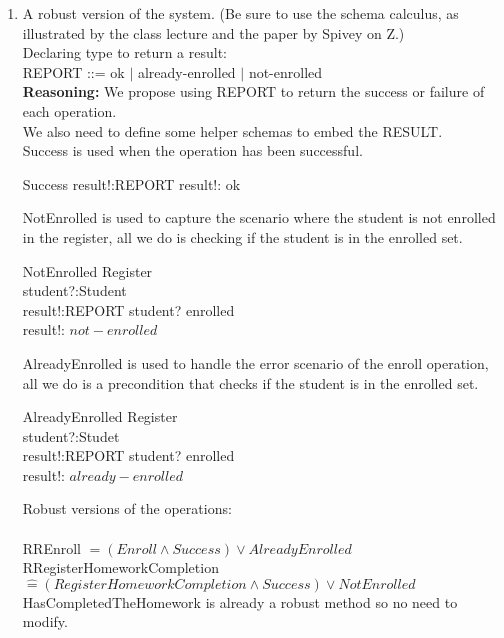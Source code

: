 \documentclass{article}
\newcommand{\estimates}{\mathrel{\hat{=}}}
\begin{document}
\begin{enumerate}
\item A robust version of the system. (Be sure to use the schema calculus, as illustrated by the class lecture and the paper by Spivey on Z.) \\
  Declaring type to return a result: \\
REPORT ::= ok $\mid$ already-enrolled $\mid$ not-enrolled \\
\textbf{Reasoning:} We propose using REPORT to return the success or failure of each operation. \\
We also need to define some helper schemas to embed the RESULT. \\
Success is used when the operation has been successful. \\
  \begin{schema}{Success}
    result!:REPORT
  \where
    result!: ok
  \end{schema}
  NotEnrolled is used to capture the scenario where the student is not enrolled in the register, all we do is checking if the student is in the enrolled set. \\
  \begin{schema}{NotEnrolled}
    \Xi Register \\
    student?:Student \\
    result!:REPORT
    \where
    student? \notin enrolled \\
    result!: $not-enrolled$
  \end{schema}
  AlreadyEnrolled is used to handle the error scenario of the enroll operation, all we do is a precondition that checks if the student is in the enrolled set. \\
  \begin{schema}{AlreadyEnrolled}
    \Xi Register \\
    student?:Studet \\
    result!:REPORT
    \where
    student? \in enrolled \\
    result!: $already-enrolled$
  \end{schema}
  Robust versions of the operations: \\
  \\
  RREnroll $\estimates (Enroll \land Success) \lor AlreadyEnrolled$\\
  RRegisterHomeworkCompletion $\estimates (RegisterHomeworkCompletion \land Success) \lor NotEnrolled $  \\
  HasCompletedTheHomework is already a robust method so no need to modify. \\
  \\
\end{enumerate}
\end{document}
